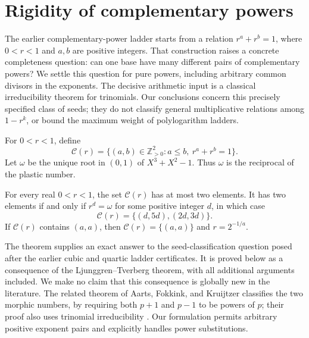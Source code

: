 
\section{Rigidity of complementary powers}
\label{rigid:sec:complementary-rigidity}

The earlier complementary-power ladder starts from a relation
$r^a+r^b=1$, where $0<r<1$ and $a,b$ are positive integers.
That construction raises a concrete completeness question: can one base
have many different pairs of complementary powers?  We settle this
question for pure powers, including arbitrary common divisors in the
exponents.  The decisive arithmetic input is a classical irreducibility
theorem for trinomials.  Our conclusions concern this precisely specified
class of seeds; they do not classify general multiplicative relations
among $1-r^k$, or bound the maximum weight of polylogarithm ladders.

For $0<r<1$, define
\[
\mathcal C(r)=\{(a,b)\in\mathbb Z_{>0}^2:
                 a\le b,\ r^a+r^b=1\}.
\]
Let $\omega$ be the unique root in $(0,1)$ of
$X^3+X^2-1$.  Thus $\omega$ is the reciprocal of the plastic number.

\begin{theorem}
\label{rigid:thm:complement-collisions}
For every real $0<r<1$, the set $\mathcal C(r)$ has at most two elements.
It has two elements if and only if $r^d=\omega$ for some positive
integer $d$, in which case
\[
\mathcal C(r)=\{(d,5d),(2d,3d)\}.
\]
If $\mathcal C(r)$ contains $(a,a)$, then
$\mathcal C(r)=\{(a,a)\}$ and $r=2^{-1/a}$.
\end{theorem}

The theorem supplies an exact answer to the seed-classification question
posed after the earlier cubic and quartic ladder certificates.  It is
proved below as a consequence of the Ljunggren--Tverberg theorem, with
all additional arguments included.  We make no claim that this
consequence is globally new in the literature.  The related theorem of
Aarts, Fokkink, and Kruijtzer classifies the two morphic numbers, by
requiring both $p+1$ and $p-1$ to be powers of $p$; their proof also uses
trinomial irreducibility \cite{rigid:AartsFokkinkKruijtzer2001}.  Our formulation
permits arbitrary positive exponent pairs and explicitly handles power
substitutions.


